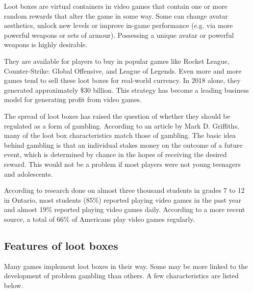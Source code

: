 \documentclass[10pt,twoside,english,a4paper]{coursepaper}
\begin{document}
	Loot boxes are virtual containers in video games that contain one or more random rewards that alter the game in some way. Some can change avatar aesthetics, unlock new levels or improve in-game performance (e.g. via more powerful weapons or sets of armour). Possessing a unique avatar or powerful weapons is highly desirable. \par
	They are available for players to buy in popular games like Rocket League, Counter-Strike: Global Offensive, and League of Legends. Even more and more games tend to sell these loot boxes for real-world currency. In 2018 alone, they generated approximately \$30 billion\cite{juniper:revenue}. This strategy has become a leading business model for generating profit from video games. \par
	The spread of loot boxes has raised the question of whether they should be regulated as a form of gambling. According to an article by Mark D. Griffiths, many of the loot box characteristics match those of gambling. The basic idea behind gambling is that an individual stakes money on the outcome of a future event, which is determined by chance in the hopes of receiving the desired reward. This would not be a problem if most players were not young teenagers and adolescents. \par
	According to research\cite{springer:research} done on almost three thousand students in grades 7 to 12 in Ontario, most students (85\%) reported playing video games in the past year and almost 19\% reported playing video games daily. According to a more recent source\cite{theesa:facts}, a total of 66\% of Americans play video games regularly. 

\subsection{Features of loot boxes} \label{sec:features}

	Many games implement loot boxes in their way. Some may be more linked to the development of problem gambling than others. A few characteristics are listed below.
\end{document}
